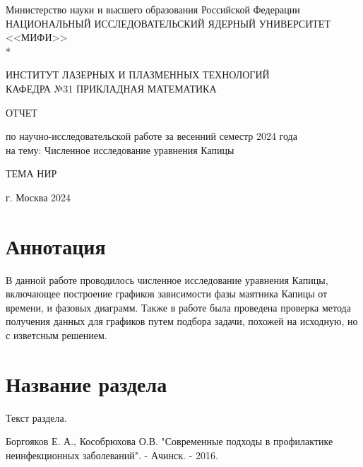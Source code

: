 \documentclass[a4paper,12pt]{article}
\begin{document}
		\renewcommand{\contentsname}{\Large Содержание}
		\renewcommand{\bibname}{\normalfont\Large\bfseries Список литературы}
		
		\begin{titlepage}
			\begin{center}
				Министерство науки и высшего образования Российской Федерации \\
				НАЦИОНАЛЬНЫЙ ИССЛЕДОВАТЕЛЬСКИЙ ЯДЕРНЫЙ УНИВЕРСИТЕТ <<МИФИ>> \\*
				\hrulefill
			\end{center}
		
		\begin{center}
			ИНСТИТУТ ЛАЗЕРНЫХ И ПЛАЗМЕННЫХ ТЕХНОЛОГИЙ\\
			КАФЕДРА №31 ПРИКЛАДНАЯ МАТЕМАТИКА
		\end{center}
		\vspace{1cm}
		
		\vspace{2em}
		
		\begin{center}
			\large{ОТЧЕТ}
			
			по научно-исследовательской работе
			за весенний семестр 2024 года \\
			
			на тему: Численное исследование уравнения Капицы
		\end{center}
		
		\begin{center}
			\large ТЕМА НИР
		\end{center}
	
	

\vspace{32em}
		
		\begin{center}
			г. Москва 2024
		\end{center}
	\end{titlepage}

	\newpage 
	\tableofcontents
	\setcounter{page}{3}
	
	\newpage
	\section*{Аннотация}
	
	В данной работе проводилось численное исследование уравнения Капицы, 
	включающее построение графиков зависимости фазы маятника Капицы от времени,
	и фазовых диаграмм. Также в работе была проведена проверка метода
	получения данных для графиков путем подбора задачи, похожей на исходную, 
	но с изветсным решением.
	
	\newpage
	\section{Название раздела}
	
	Текст раздела.
	
	\newpage
	
	\begin{thebibliography}{w:40}
		
		 Боргояков Е. А., Кособрюхова О.В. "Современные подходы в профилактике неинфекционных заболеваний". - Ачинск. - 2016.
		
	\end{thebibliography}
	
	
\end{document}
